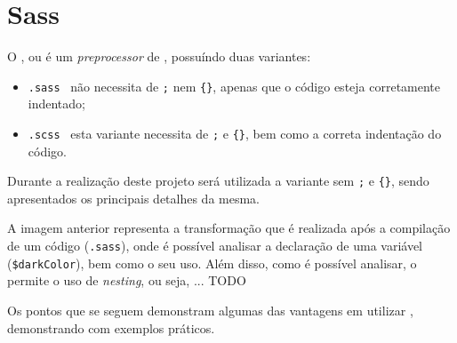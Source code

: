 \section{Sass}

\begin{minipage}{.3\textwidth}
\end{minipage}
\begin{minipage}{.7\textwidth}
	\minipagerestore
	O \textbf{}, ou \underline{} é um \textit{preprocessor} de \textbf{}, possuíndo duas variantes:

	\begin{itemize}
		\item \texttt{.sass} \textemdash~não necessita de \texttt{;} nem \verb|{}|, apenas que o código esteja corretamente indentado;
		\item \texttt{.scss} \textemdash~esta variante necessita de \texttt{;} e \verb|{}|, bem como a correta indentação do código.
	\end{itemize}
\end{minipage}

Durante a realização deste projeto será utilizada a variante sem \texttt{;} e \verb|{}|, sendo apresentados os principais detalhes da mesma.


A imagem anterior representa a transformação que é realizada após a compilação de um código \textbf{} (\texttt{.sass}), onde é possível analisar a declaração de uma variável (\verb|$darkColor|), bem como o seu uso. Além disso, como é possível analisar, o \textbf{} permite o uso de \textit{nesting}, ou seja, ... TODO

Os pontos que se seguem demonstram algumas das vantagens em utilizar \textbf{}, demonstrando com exemplos práticos.





